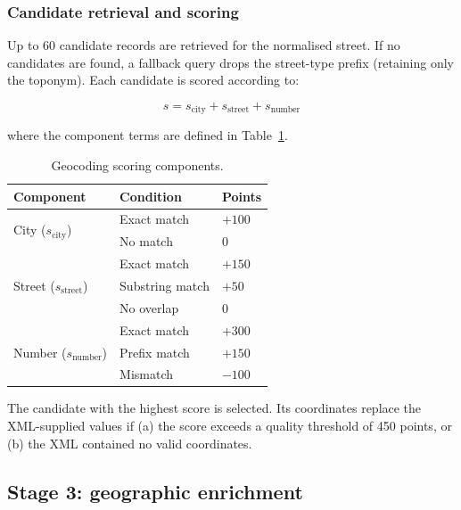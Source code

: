 \documentclass[runningheads,orivec]{llncs}
\begin{document}
\subsubsection{Candidate retrieval and scoring}

Up to 60 candidate records are retrieved for the normalised street.
If no candidates are found, a fallback query drops the street-type prefix
(retaining only the toponym). Each candidate is scored according to:

\begin{equation}
  s = s_\text{city} + s_\text{street} + s_\text{number}
  \label{eq:geo_score}
\end{equation}

where the component terms are defined in
Table~\ref{tab:geo_scoring}.

\begin{table}[h]
\centering
\caption{Geocoding scoring components.}
\label{tab:geo_scoring}
\begin{tabular}{lll}
\toprule
\textbf{Component} & \textbf{Condition} & \textbf{Points} \\
\midrule
\multirow{2}{*}{City ($s_\text{city}$)}
  & Exact match & $+100$ \\
  & No match    & $0$    \\
\midrule
\multirow{3}{*}{Street ($s_\text{street}$)}
  & Exact match          & $+150$ \\
  & Substring match      & $+50$  \\
  & No overlap           & $0$    \\
\midrule
\multirow{3}{*}{Number ($s_\text{number}$)}
  & Exact match          & $+300$ \\
  & Prefix match         & $+150$ \\
  & Mismatch             & $-100$ \\
\bottomrule
\end{tabular}
\end{table}

The candidate with the highest score is selected. Its coordinates
replace the XML-supplied values if (a) the score exceeds a quality
threshold of 450 points, or (b) the XML contained no valid
coordinates.

\subsection{Stage 3: geographic enrichment}
\label{sec:enrichment}
\end{document}
